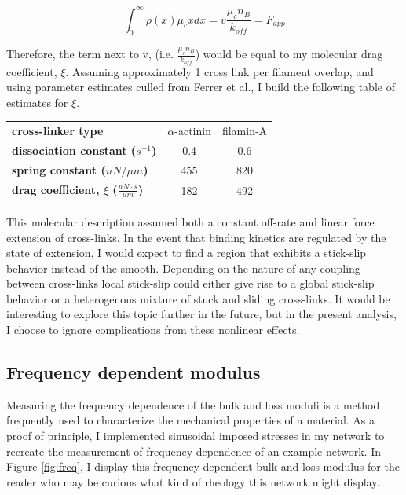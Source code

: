 \begin{equation}
\int_{0}^{\infty}\rho(x)\mu_cx dx = v \frac{\mu_c n_B}{k_{off}}= F_{app}
\end{equation}

Therefore, the term next to v, (i.e. $\tfrac{\mu_c n_B}{k_{off}}$) would be equal to my molecular drag coefficient, $\xi$.  Assuming approximately 1 cross link per filament overlap, and using parameter estimates culled from Ferrer et al., I build the following table of estimates for $\xi$.

\begin{table}[h]
\begin{tabular}{| l | c | c |}
\hline
\textbf{cross-linker type} & $\alpha$-actinin & filamin-A  \\ \cline{1-1}
\textbf{dissociation constant ($s^{-1}$)} & 0.4 & 0.6 \\ \cline{1-1}
\textbf{spring constant ($nN / \mu m$)} & 455 & 820 \\ \cline{1-1}
\textbf{drag coefficient, $\xi$ ($\tfrac{nN \cdot s}{\mu m}$)} & 182 & 492 \\ 
\hline
\end{tabular}
\end{table}



This molecular description assumed both a constant off-rate and linear force extension of cross-links.  In the event that binding kinetics are regulated by the state of extension, I would expect to find a region that exhibits a stick-slip behavior instead of the smooth.  Depending on the nature of any coupling between cross-links local stick-slip could either give rise to a global stick-slip behavior or a heterogenous mixture of stuck and sliding cross-links.  It would be interesting to explore this topic further in the future, but in the present analysis, I choose to ignore complications from these nonlinear effects.


\subsection{Frequency dependent modulus}
Measuring the frequency dependence of the bulk and loss moduli is a method frequently used to characterize the mechanical properties of a material.  As a proof of principle, I implemented sinusoidal imposed stresses in my network to recreate the measurement of frequency dependence of an example network.  In Figure \ref{fig:freq}, I display this frequency dependent bulk and loss modulus for the reader who may be curious what kind of rheology this network might display.


